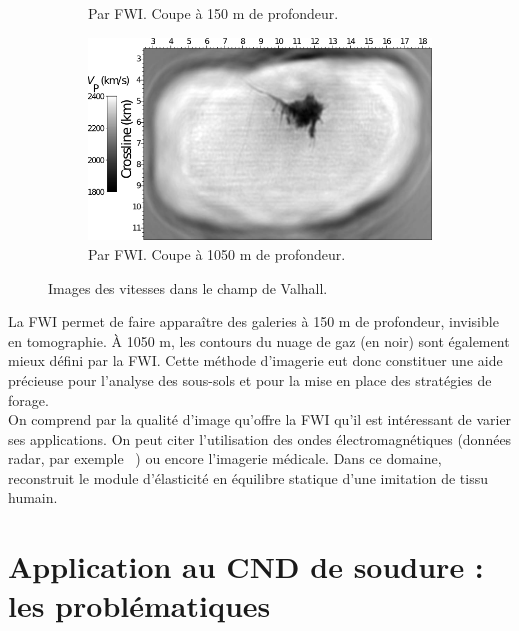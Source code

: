 \begin{figure}[!h]
\begin{subfigure}[b]{0.4\textwidth}
        \caption{Par FWI. Coupe à 150 m de profondeur.}
        \label{}
    \end{subfigure}
    \hspace{0.5cm}
    \begin{subfigure}[b]{0.4\textwidth}
        \includegraphics[width=\textwidth]{img/geophy4.png}
        \caption{Par FWI. Coupe à 1050 m de profondeur.}
        \label{}
    \end{subfigure}
    \caption{Images des vitesses dans le champ de Valhall.\label{valhall}}
\end{figure} 
    
La FWI permet de faire apparaître des galeries à 150 m de profondeur, invisible en tomographie. À 1050 m, les contours du nuage de gaz (en noir) sont également mieux défini par la FWI. Cette méthode d'imagerie eut donc constituer une aide précieuse pour l'analyse des sous-sols et pour la mise en place des stratégies de forage.\\

On comprend par la qualité d'image qu'offre la FWI qu'il est intéressant de varier ses applications. On peut citer l'utilisation des ondes électromagnétiques (données radar, par exemple ~\cite{lopes}) ou encore l'imagerie médicale. Dans ce domaine, \cite{oberai_03,oberai_04} reconstruit le module d'élasticité en équilibre statique d'une imitation de tissu humain.

\section{Application au CND de soudure : les problématiques}

